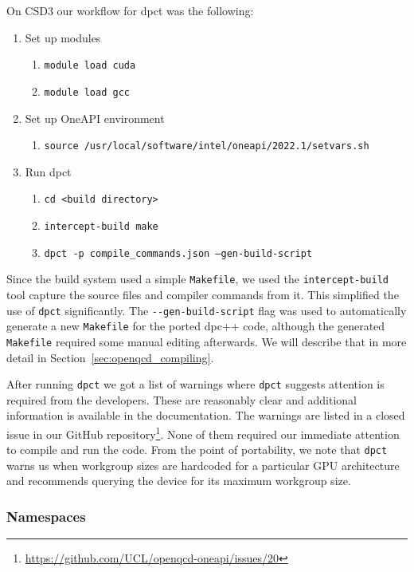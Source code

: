 \documentclass[../main]{subfiles}
\begin{document}
On CSD3 our workflow for dpct was the following:
\begin{enumerate}
	\item Set up modules
	      \begin{enumerate}
		      \item\texttt{module load cuda}
		      \item\texttt{module load gcc}
	      \end{enumerate}
	\item Set up OneAPI environment
	      \begin{enumerate}
		      \item\texttt{source /usr/local/software/intel/oneapi/2022.1/setvars.sh}
	      \end{enumerate}
	\item Run dpct
	      \begin{enumerate}
		      \item\texttt{cd <build directory>}
		      \item\texttt{intercept-build make}
		      \item\texttt{dpct -p compile\_commands.json --gen-build-script}
	      \end{enumerate}
\end{enumerate}
Since the build system used a simple \texttt{Makefile}, we used the \texttt{intercept-build} tool capture the source files and compiler commands from it.
This simplified the use of \texttt{dpct} significantly.
The \verb !--gen-build-script! flag was used to automatically generate a new \texttt{Makefile} for the ported dpc++ code, although the generated \texttt{Makefile} required some manual editing afterwards.
We will describe that in more detail in Section~\ref{sec:openqcd_compiling}.

After running \texttt{dpct} we got a list of warnings where \texttt{dpct} suggests attention is required from the developers.
These are reasonably clear and additional information is available in the documentation.
The warnings are listed in a closed issue in our GitHub repository\footnote{\url{https://github.com/UCL/openqcd-oneapi/issues/20}}.
None of them required our immediate attention to compile and run the code.
From the point of portability, we note that \texttt{dpct} warns us when workgroup sizes are hardcoded for a particular GPU architecture and recommends querying the device for its maximum workgroup size.

\subsubsection{Namespaces}\label{sec:openqcd_namespaces}
\end{document}
